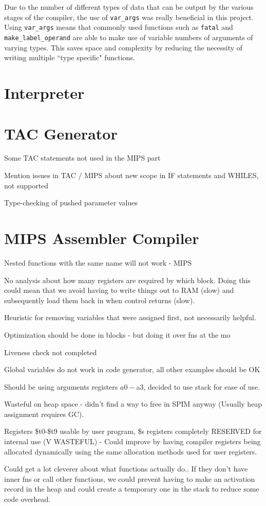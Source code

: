 \ \\ \ \\
Due to the number of different types of data that can be output by the various stages of the compiler, the use of \verb!var_args! was really beneficial in this project. Using \verb!var_args! means that commonly used functions such as \verb!fatal! and \verb!make_label_operand! are able to make use of variable numbers of arguments of varying types. This saves space and complexity by reducing the necessity of writing multiple ``type specific" functions.

\section{Interpreter}

\section{TAC Generator}
Some TAC statements not used in the MIPS part

Mention issues in TAC / MIPS about new scope in IF statements and WHILES, not supported

Type-checking of pushed parameter values


\section{MIPS Assembler Compiler}
Nested functions with the same name will not work - MIPS 

No analysis about how many registers are required by which block. Doing this could mean that we avoid having to write things out to RAM (slow) and subsequently load them back in when control returns (slow).

Heuristic for removing variables that were assigned first, not necessarily helpful.

Optimization should be done in blocks - but doing it over fns at the mo

Liveness check not completed

Global variables do not work in code generator, all other examples should be OK


Should be using arguments registers $a0-$a3, decided to use stack for ease of use.


Wasteful on heap space - didn't find a way to free in SPIM anyway (Usually heap assignment requires GC).

Registers \$t0-\$t9 usable by user program, \$s registers completely RESERVED for internal use (V WASTEFUL) - Could improve by having compiler registers being allocated dynamically using the same allocation methods used for user registers.


Could get a lot cleverer about what functions actually do.. If they don't have inner fns or call other functions, we could prevent having to make an activation record in the heap and could create a temporary one in the stack to reduce some code overhead. 
